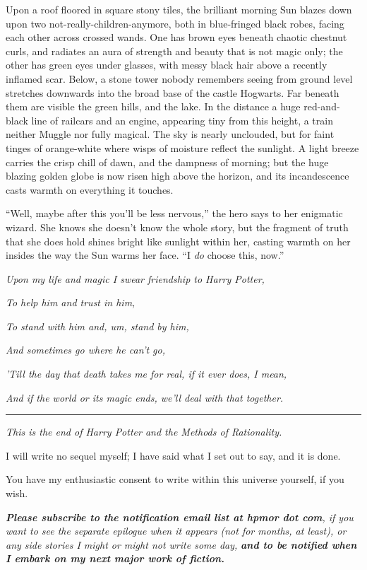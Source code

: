 Upon a roof floored in square stony tiles, the brilliant morning Sun blazes down upon two not-really-children-anymore, both in blue-fringed black robes, facing each other across crossed wands. One has brown eyes beneath chaotic chestnut curls, and radiates an aura of strength and beauty that is not magic only; the other has green eyes under glasses, with messy black hair above a recently inflamed scar. Below, a stone tower nobody remembers seeing from ground level stretches downwards into the broad base of the castle Hogwarts. Far beneath them are visible the green hills, and the lake. In the distance a huge red-and-black line of railcars and an engine, appearing tiny from this height, a train neither Muggle nor fully magical. The sky is nearly unclouded, but for faint tinges of orange-white where wisps of moisture reflect the sunlight. A light breeze carries the crisp chill of dawn, and the dampness of morning; but the huge blazing golden globe is now risen high above the horizon, and its incandescence casts warmth on everything it touches.

``Well, maybe after this you'll be less nervous,'' the hero says to her enigmatic wizard. She knows she doesn't know the whole story, but the fragment of truth that she does hold shines bright like sunlight within her, casting warmth on her insides the way the Sun warms her face. ``I \emph{do} choose this, now.''

\emph{Upon my life and magic I swear friendship to Harry Potter,}

\emph{To help him and trust in him,}

\emph{To stand with him and, um, stand by him,}

\emph{And sometimes go where he can't go,}

\emph{'Till the day that death takes me for real, if it ever does, I mean,}

\emph{And if the world or its magic ends, we'll deal with that together.}

\begin{center}\rule{3in}{0.4pt}\end{center}

\emph{This is the end of Harry Potter and the Methods of Rationality.}

I will write no sequel myself; I have said what I set out to say, and it is done.

You have my enthusiastic consent to write within this universe yourself, if you wish.

\emph{\textbf{Please subscribe to the notification email list at hpmor dot com}}\emph{, if you want to see the separate epilogue when it appears (not for months, at least), or any side stories I might or might not write some day,} \emph{\textbf{and to be notified when I embark on my next major work of fiction.}}

